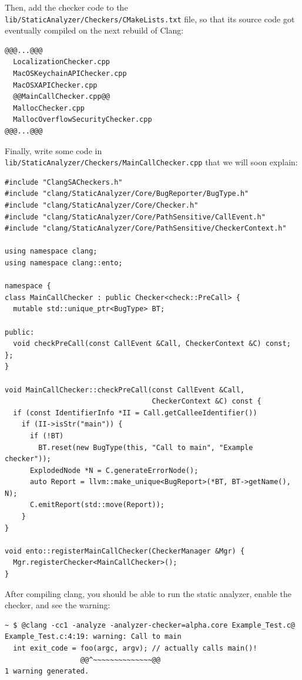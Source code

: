 \documentclass[a4paper,12pt]{article}
\newenvironment{nobr}{\begin{minipage}{\textwidth}\setlength\parskip{1em}
}{\end{minipage}\ignorespacesafterend}
\begin{document}
\begin{nobr}
Then, add the checker code to the \lstinline|lib/StaticAnalyzer/Checkers/CMakeLists.txt| file, so that its source code got eventually compiled on the next rebuild of Clang:
\begin{lstlisting}[style=commandline,title=\lstinline|@CMakeLists.txt@|]
@@@...@@@
  LocalizationChecker.cpp
  MacOSKeychainAPIChecker.cpp
  MacOSXAPIChecker.cpp
  @@MainCallChecker.cpp@@
  MallocChecker.cpp
  MallocOverflowSecurityChecker.cpp
@@@...@@@
\end{lstlisting}
\end{nobr}

\begin{nobr}
Finally, write some code in \lstinline|lib/StaticAnalyzer/Checkers/MainCallChecker.cpp| that we will soon explain:
\begin{lstlisting}[style=cplusplus,title=\lstinline|MainCallChecker.cpp|]
#include "ClangSACheckers.h"
#include "clang/StaticAnalyzer/Core/BugReporter/BugType.h"
#include "clang/StaticAnalyzer/Core/Checker.h"
#include "clang/StaticAnalyzer/Core/PathSensitive/CallEvent.h"
#include "clang/StaticAnalyzer/Core/PathSensitive/CheckerContext.h"

using namespace clang;
using namespace clang::ento;

namespace {
class MainCallChecker : public Checker<check::PreCall> {
  mutable std::unique_ptr<BugType> BT;

public:
  void checkPreCall(const CallEvent &Call, CheckerContext &C) const;
};
}

void MainCallChecker::checkPreCall(const CallEvent &Call,
                                   CheckerContext &C) const {
  if (const IdentifierInfo *II = Call.getCalleeIdentifier())
    if (II->isStr("main")) {
      if (!BT)
        BT.reset(new BugType(this, "Call to main", "Example checker"));
      ExplodedNode *N = C.generateErrorNode();
      auto Report = llvm::make_unique<BugReport>(*BT, BT->getName(), N);
      C.emitReport(std::move(Report));
    }
}

void ento::registerMainCallChecker(CheckerManager &Mgr) {
  Mgr.registerChecker<MainCallChecker>();
}
\end{lstlisting}
\end{nobr}

\begin{nobr}
After compiling clang, you should be able to run the static analyzer, enable the checker, and see the warning:
\begin{lstlisting}[style=commandline]
~ $ @clang -cc1 -analyze -analyzer-checker=alpha.core Example_Test.c@
Example_Test.c:4:19: warning: Call to main
  int exit_code = foo(argc, argv); // actually calls main()!
                  @@^~~~~~~~~~~~~~~@@
1 warning generated.
\end{lstlisting}
\end{nobr}
\end{document}

